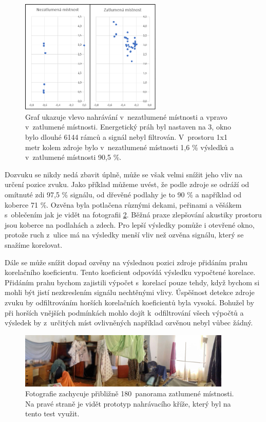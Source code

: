 \begin{figure}[hbt]
	\centering
	\includegraphics[width=0.6\textwidth]{obrazky-figures/graf_zatlumeneVSnezatlumene.png}
	\caption{Graf ukazuje vlevo nahrávání v~nezatlumené místnosti a vpravo v~zatlumené místnosti. Energetický práh byl nastaven na 3, okno bylo dlouhé 6144 rámců a signál nebyl filtrován. V~prostoru 1x1 metr kolem zdroje bylo v~nezatlumené místnosti 1,6 \% výsledků a v~zatlumené místnosti 90,5 \%.}
	\label{pic:test2}
\end{figure}

Dozvuku se nikdy nedá zbavit úplně, může se však velmi snížit jeho vliv na určení pozice zvuku. Jako příklad můžeme uvést, že podle zdroje \cite{odrazy} se odráží od omítnuté zdi 97,5 \% signálu, od dřevěné podlahy je to 90 \% a například od koberce 71 \%. Ozvěna byla potlačena různými dekami, peřinami a věšákem s~oblečením jak je vidět na fotografii \ref{pic:neporadek}. Běžná praxe zlepšování akustiky prostoru jsou koberce na podlahách a zdech. Pro lepší výsledky pomůže i otevřené okno, protože ruch z~ulice má na výsledky menší vliv než ozvěna signálu, který se snažíme korelovat.

Dále se může snížit dopad ozvěny na výslednou pozici zdroje přidáním prahu korelačního koeficientu. Tento koeficient odpovídá výsledku vypočtené korelace. Přidáním prahu bychom zajistili výpočet s~korelací pouze tehdy, když bychom si mohli být jistí nezkreslením signálu nechtěnými vlivy. Úspěšnost detekce zdroje zvuku by odfiltrováním horších korelačních koeficientů byla vysoká. Bohužel by při horších vnějších podmínkách mohlo dojít k~odfiltrování všech výpočtů a výsledek by z~určitých míst ovlivněných například ozvěnou nebyl vůbec žádný.

\begin{figure}[!ht]
	\centering
	\includegraphics[width=0.9\textwidth]{obrazky-figures/neporadek.png}
	\caption{Fotografie zachycuje přibližně 180\degree \ panorama zatlumené místnosti. Na pravé straně je vidět prototyp nahrávacího kříže, který byl na tento test využit.}
	\label{pic:neporadek}
\end{figure}
\newpage

